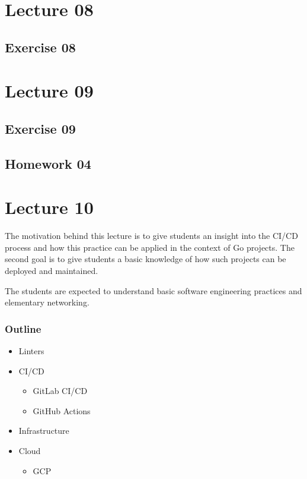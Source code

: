 \documentclass[
  digital,
  color,
  oneside,
  nosansbold,
  nocolorbold,
  lof,
  lot,
]{fithesis4}
\begin{document}
\section{Lecture 08}

\subsection{Exercise 08}

\section{Lecture 09}

\subsection{Exercise 09}

\subsection{Homework 04}

\section{Lecture 10}

The motivation behind this lecture is to give students an insight into the CI/CD process and how this practice can be applied in the context of Go projects. The second goal is to give students a basic knowledge of how such projects can be deployed and maintained.

The students are expected to understand basic software engineering practices and elementary networking.

\subsubsection{Outline}

\begin{itemize}
    \item Linters
    \item CI/CD
    \begin{itemize}
        \item GitLab CI/CD
        \item GitHub Actions
    \end{itemize}
    \item Infrastructure
    \item Cloud
    \begin{itemize}
        \item GCP
    \end{itemize}
\end{itemize}
\end{document}
